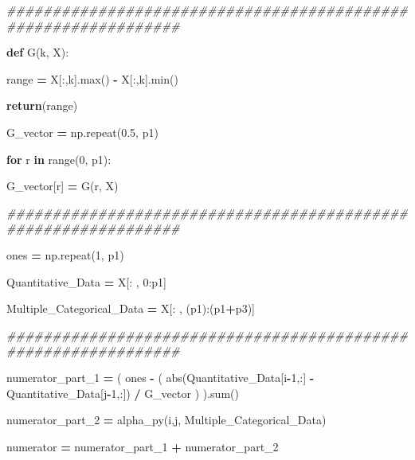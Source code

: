 \documentclass[
  11pt,
  a4paper,
]{article}
\newenvironment{Shaded}{\begin{snugshade}}{\end{snugshade}}
\newcommand{\BuiltInTok}[1]{#1}
\newcommand{\CommentTok}[1]{\textcolor[rgb]{0.56,0.35,0.01}{\textit{#1}}}
\newcommand{\ControlFlowTok}[1]{\textcolor[rgb]{0.13,0.29,0.53}{\textbf{#1}}}
\newcommand{\DecValTok}[1]{\textcolor[rgb]{0.00,0.00,0.81}{#1}}
\newcommand{\FloatTok}[1]{\textcolor[rgb]{0.00,0.00,0.81}{#1}}
\newcommand{\KeywordTok}[1]{\textcolor[rgb]{0.13,0.29,0.53}{\textbf{#1}}}
\newcommand{\NormalTok}[1]{#1}
\newcommand{\OperatorTok}[1]{\textcolor[rgb]{0.81,0.36,0.00}{\textbf{#1}}}
\begin{document}
\begin{Shaded}
\begin{Highlighting}[]
\CommentTok{\#\#\#\#\#\#\#\#\#\#\#\#\#\#\#\#\#\#\#\#\#\#\#\#\#\#\#\#\#\#\#\#\#\#\#\#\#\#\#\#\#\#\#\#\#\#\#\#\#\#\#\#\#\#\#\#\#\#\#\#\#\#\#}
            
            \KeywordTok{def}\NormalTok{ G(k, X):}

                \BuiltInTok{range} \OperatorTok{=}\NormalTok{ X[:,k].}\BuiltInTok{max}\NormalTok{() }\OperatorTok{{-}}\NormalTok{ X[:,k].}\BuiltInTok{min}\NormalTok{() }

                \ControlFlowTok{return}\NormalTok{(}\BuiltInTok{range}\NormalTok{)}

\NormalTok{            G\_vector }\OperatorTok{=}\NormalTok{ np.repeat(}\FloatTok{0.5}\NormalTok{, p1)}

            \ControlFlowTok{for}\NormalTok{ r }\KeywordTok{in} \BuiltInTok{range}\NormalTok{(}\DecValTok{0}\NormalTok{, p1):}

\NormalTok{                G\_vector[r] }\OperatorTok{=}\NormalTok{ G(r, X)}

\CommentTok{\#\#\#\#\#\#\#\#\#\#\#\#\#\#\#\#\#\#\#\#\#\#\#\#\#\#\#\#\#\#\#\#\#\#\#\#\#\#\#\#\#\#\#\#\#\#\#\#\#\#\#\#\#\#\#\#\#\#\#\#\#\#\#}
    
\NormalTok{            ones }\OperatorTok{=}\NormalTok{ np.repeat(}\DecValTok{1}\NormalTok{, p1)}

\NormalTok{            Quantitative\_Data }\OperatorTok{=}\NormalTok{ X[: , }\DecValTok{0}\NormalTok{:p1]}
    
\NormalTok{            Multiple\_Categorical\_Data }\OperatorTok{=}\NormalTok{ X[: , (p1):(p1}\OperatorTok{+}\NormalTok{p3)]}
 
    
\CommentTok{\#\#\#\#\#\#\#\#\#\#\#\#\#\#\#\#\#\#\#\#\#\#\#\#\#\#\#\#\#\#\#\#\#\#\#\#\#\#\#\#\#\#\#\#\#\#\#\#\#\#\#\#\#\#\#\#\#\#\#\#\#\#\#}

\NormalTok{            numerator\_part\_1 }\OperatorTok{=}\NormalTok{ ( ones }\OperatorTok{{-}}\NormalTok{ ( }\BuiltInTok{abs}\NormalTok{(Quantitative\_Data[i}\OperatorTok{{-}}\DecValTok{1}\NormalTok{,:] }\OperatorTok{{-}}\NormalTok{ Quantitative\_Data[j}\OperatorTok{{-}}\DecValTok{1}\NormalTok{,:]) }\OperatorTok{/}\NormalTok{ G\_vector ) ).}\BuiltInTok{sum}\NormalTok{() }

\NormalTok{            numerator\_part\_2 }\OperatorTok{=}\NormalTok{   alpha\_py(i,j, Multiple\_Categorical\_Data)}

\NormalTok{            numerator }\OperatorTok{=}\NormalTok{ numerator\_part\_1 }\OperatorTok{+}\NormalTok{ numerator\_part\_2}


\end{Highlighting}
\end{Shaded}
\end{document}
